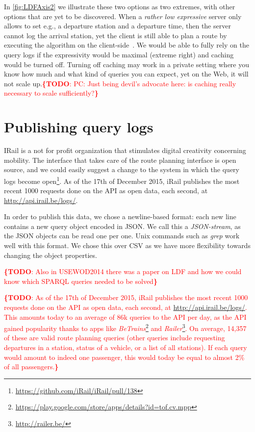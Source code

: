 \documentclass{sig-alternate}
\newcommand{\todo}[1]{\noindent\textcolor{red}{{\bf \{TODO}: #1{\bf \}}}}
\begin{document}
In \cref{fig:LDFAxis2} we illustrate these two options as two extremes, with other options that are yet to be discovered.
When a \emph{rather low expressive} server only allows to set e.g., a departure station and a departure time, then the server cannot log the arrival station, yet the client is still able to plan a route by executing the algorithm on the client-side~\cite{lc}.
We would be able to fully rely on the query logs if the expressivity would be maximal (extreme right) and caching would be turned off.
Turning off caching may work in a private setting where you know how much and what kind of queries you can expect, yet on the Web, it will not scale up.\todo{PC: Just being devil's advocate here: is caching really necessary to scale sufficiently?}

\section{Publishing query logs}
\label{sec:publishingquerylogs}

IRail is a not for profit organization that stimulates digital creativity concerning mobility.
The interface that takes care of the route planning interface is open source, and we could easily suggest a change to the system in which the query logs become open\footnote{\url{https://github.com/iRail/iRail/pull/138}}.
As of the 17th of December 2015, iRail publishes the most recent 1000 requests done on the API as open data, each second, at \url{http://api.irail.be/logs/}.

In order to publish this data, we chose a newline-based format: each new line contains a new query object encoded in JSON. 
We call this a \emph{JSON-stream}, as the JSON objects can be read one per one.
Unix commands such as \emph{grep} work well with this format.
We chose this over CSV as we have more flexibility towards changing the object properties.


\todo{Also in USEWOD2014 there was a paper on LDF and how we could know which SPARQL queries needed to be solved}

\todo{As of the 17th of December 2015, iRail publishes the most recent 1000 requests done on the API as open data, each second, at \url{http://api.irail.be/logs/}.
This amounts today to an average of 86k queries to the API per day, as the API gained popularity thanks to apps like \emph{BeTrains}\footnote{\url{https://play.google.com/store/apps/details?id=tof.cv.mpp}} and \emph{Railer}\footnote{\url{http://railer.be/}}.
On average, 14,357 of these are valid route planning queries (other queries include requesting departures in a station, status of a vehicle, or a list of all stations).
If each query would amount to indeed one passenger, this would today be equal to almost 2\% of all passengers.}
\end{document}
